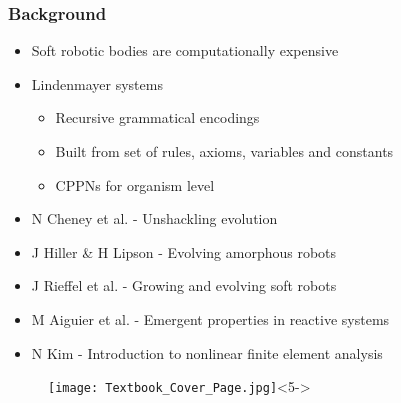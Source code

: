 \documentclass[serif, pdf]{beamer}
\begin{document}

\begin{frame}
    \frametitle{Background}
    \begin{minipage}{0.7\textwidth}
        \begin{itemize}
            \item<1-> Soft robotic bodies are computationally expensive
            \item<2-> Lindenmayer systems
            \begin{itemize}
                \item<3-> Recursive grammatical encodings
                \item<4-> Built from set of rules, axioms, variables and constants
                \item<5-> CPPNs for organism level
            \end{itemize}
            \item<3-> N Cheney et al. - Unshackling evolution
            \item<3-> J Hiller \& H Lipson - Evolving amorphous robots
            \item<3-> J Rieffel et al. - Growing and evolving soft robots
            \item<4-> M Aiguier et al. - Emergent properties in reactive systems
           
            \item<5-> N Kim - Introduction to nonlinear finite element analysis
        \end{itemize}
    \end{minipage}
    \begin{minipage}{0.25\textwidth}
        \begin{figure}
            \texttt{[image: Textbook\_Cover\_Page.jpg]}<5->
        \end{figure}
    \end{minipage}
\end{frame}

\end{document}
